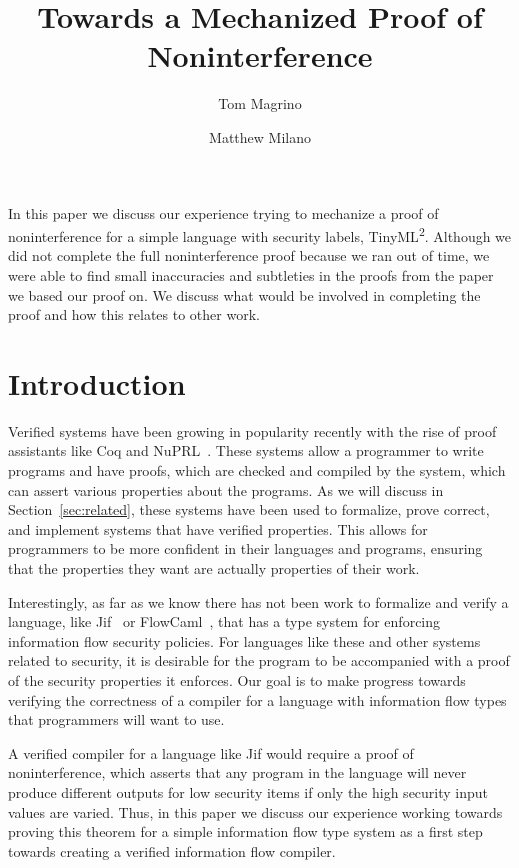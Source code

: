\documentclass[a4paper]{article}
\title{Towards a Mechanized Proof of Noninterference}
\author{Tom Magrino \and Matthew Milano}
\newcommand{\langName}[0]{TinyML\textsuperscript{2}}
\theoremstyle{plain}
\theoremstyle{definition}
\begin{document}
\maketitle

\abstract

In this paper we discuss our experience trying to mechanize a proof of
noninterference for a simple language with security labels, \langName.  Although
we did not complete the full noninterference proof because we ran out of time,
we were able to find small inaccuracies and subtleties in the proofs from the
paper we based our proof on.  We discuss what would be involved in completing
the proof and how this relates to other work.

\section{Introduction}

Verified systems have been growing in popularity recently with the rise of proof
assistants like Coq and NuPRL~\cite{coqart,nuprl}.  These systems allow a
programmer to write programs and have proofs, which are checked and compiled by
the system, which can assert various properties about the programs.  As we will
discuss in Section~\ref{sec:related}, these systems have been used to formalize,
prove correct, and implement systems that have verified properties.  This allows
for programmers to be more confident in their languages and programs, ensuring
that the properties they want are actually properties of their work.

Interestingly, as far as we know there has not been work to formalize and verify
a language, like Jif~\cite{myers1999jflow} or FlowCaml~\cite{simonet2003flow},
that has a type system for enforcing information flow security policies.  For
languages like these and other systems related to security, it is desirable for
the program to be accompanied with a proof of the security properties it
enforces.  Our goal is to make progress towards verifying the correctness of a
compiler for a language with information flow types that programmers will want
to use.

A verified compiler for a language like Jif would require a proof of
noninterference, which asserts that any program in the language will never
produce different outputs for low security items if only the high security input
values are varied.  Thus, in this paper we discuss our experience working
towards proving this theorem for a simple information flow type system as a
first step towards creating a verified information flow compiler.
\end{document}
